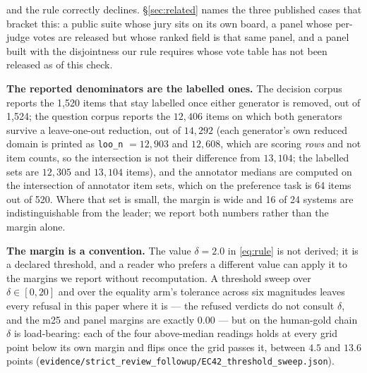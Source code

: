 \documentclass{article}
\newcommand{\ids}[1]{\texttt{\small #1}} %
\begin{document}
and the rule correctly declines. \S\ref{sec:related} names the three published cases that bracket this: a public suite whose jury sits on its own board, a panel whose per-judge votes are released but whose ranked field is that same panel, and a panel built with the disjointness our rule requires whose vote table has not been released as of this check.

\textbf{The reported denominators are the labelled ones.} The decision corpus reports the 1,520 items that stay labelled once either generator is removed, out of 1,524; the question corpus reports the $12,406$ items on which both generators survive a leave-one-out reduction, out of $14,292$ (each generator's own reduced domain is printed as \texttt{loo\_n} $=12,903$ and $12,608$, which are scoring \emph{rows} and not item counts, so the intersection is not their difference from $13,104$; the labelled sets are $12,305$ and $13,104$ items), and the annotator medians are computed on the intersection of annotator item sets, which on the preference task is 64 items out of 520. Where that set is small, the margin is wide and 16 of 24 systems are indistinguishable from the leader; we report both numbers rather than the margin alone.

\textbf{The margin is a convention.} The value $\delta = 2.0$ in \eqref{eq:rule} is not derived; it is a declared threshold, and a reader who prefers a different value can apply it to the margins we report without recomputation. A threshold sweep over $\delta \in [0,20]$ and over the equality arm's tolerance across six magnitudes leaves every refusal in this paper where it is --- the refused verdicts do not consult $\delta$, and the m25 and panel margins are exactly $0.00$ --- but on the human-gold chain $\delta$ is load-bearing: each of the four above-median readings holds at every grid point below its own margin and flips once the grid passes it, between $4.5$ and $13.6$ points (\ids{evidence/strict\_review\_followup/EC42\_threshold\_sweep.json}).
\end{document}
